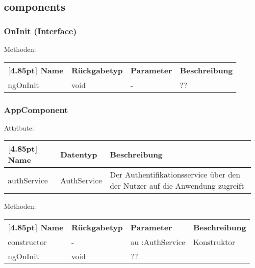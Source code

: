         \subsection{components}
        
            \subsubsection{OnInit (Interface)}
                
                Methoden:
        		\begin{center}
                \setlength\tabcolsep{5pt}
                	\renewcommand{\arraystretch}{1.5}
                    	\begin{tabularx}{\textwidth}{|l|l|l|X|}
                    	\hline
                    	\rowcolor[gray]{0.75}[4.85pt]
                		Name & Rückgabetyp & Parameter & Beschreibung \\ \hline 
                        ngOnInit & void & - & ?? \\ \hline
                        \end{tabularx}
        		\end{center}
        
            \subsubsection{AppComponent}
            
                Attribute:
                \begin{center}
                	\renewcommand{\arraystretch}{1.5}
                    \setlength\tabcolsep{5pt}
                	\begin{tabularx}{\textwidth}{|l|l|X|}
                		\hline
                        \rowcolor[gray]{0.75}[4.85pt]            		
                        Name & Datentyp & Beschreibung \\ \hline
                        authService & AuthService & Der Authentifikationsservice über den der Nutzer auf die Anwendung zugreift \\ \hline
                	\end{tabularx}
                \end{center}
                
                Methoden:
        		\begin{center}
                \setlength\tabcolsep{5pt}
                	\renewcommand{\arraystretch}{1.5}
                    	\begin{tabularx}{\textwidth}{|l|l|l|X|}
                    	\hline
                    	\rowcolor[gray]{0.75}[4.85pt]
                		Name & Rückgabetyp & Parameter & Beschreibung \\ \hline 
                        constructor & - & au :AuthService & Konstruktor \\ \hline
                        ngOnInit & void & ?? \\ \hline
                        \end{tabularx}
        		\end{center}
        	
